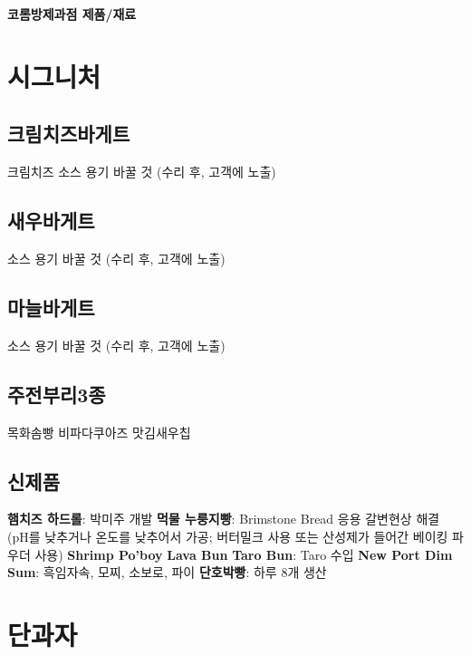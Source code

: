 \documentclass{myproc}
\begin{document}
\begin{center}
  \textcolor{blue2}{\large\bf 코롬방제과점 제품/재료}
  \\
  \vspace*{0.8cm}

\end{center}

\small



\section{\textcolor{red2}{시그니처}}
\subsection{\textcolor{blue2}{크림치즈바게트}}
\bit
\w 크림치즈 소스 용기 바꿀 것 (수리 후, 고객에 노출)
\eit

\subsection{\textcolor{blue2}{새우바게트}}
\bit
\w 소스 용기 바꿀 것 (수리 후, 고객에 노출)
\eit

\subsection{\textcolor{blue2}{마늘바게트}}
\bit
\w 소스 용기 바꿀 것 (수리 후, 고객에 노출)
\eit

\subsection{\textcolor{blue2}{주전부리3종}}
\bit
\w 목화솜빵
\w 비파다쿠아즈
\w 맛김새우칩
\eit
\subsection{\textcolor{blue2}{신제품}}
\bit
\w \textcolor{green2}{\bf{}햄치즈 하드롤}: 박미주 개발
\w \textcolor{green2}{\bf{}먹물 누룽지빵}: Brimstone Bread 응용
  \bit
  \w 갈변현상 해결 (pH를 낮추거나 온도를 낮추어서 가공; 버터밀크 사용 또는
  산성제가 들어간 베이킹 파우더 사용)
  \eit
\w \textcolor{green2}{\bf{}Shrimp Po'boy}
\w \textcolor{green2}{\bf{}Lava Bun}
\w \textcolor{green2}{\bf{}Taro Bun}: Taro 수입
\w \textcolor{green2}{\bf{}New Port Dim Sum}: 흑임자속, 모찌, 소보로, 파이
\w \textcolor{green2}{\bf{}단호박빵}: 하루 8개 생산
\eit

\section{\textcolor{red2}{단과자}}
\end{document}
